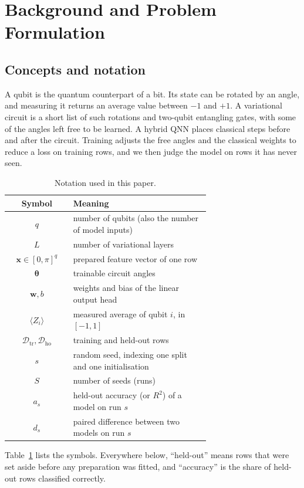 \documentclass[conference]{IEEEtran}
\begin{document}
\section{Background and Problem Formulation}
\subsection{Concepts and notation}
A qubit is the quantum counterpart of a bit. Its state can be rotated by an angle, and measuring it returns an average value between $-1$ and $+1$. A variational circuit is a short list of such rotations and two-qubit entangling gates, with some of the angles left free to be learned. A hybrid QNN places classical steps before and after the circuit. Training adjusts the free angles and the classical weights to reduce a loss on training rows, and we then judge the model on rows it has never seen.

\begin{table}[!t]
\caption{Notation used in this paper.}
\label{tab:notation}
\centering\footnotesize
\begin{tabular}{cp{0.68\linewidth}}
\toprule
Symbol & Meaning\\
\midrule
$q$ & number of qubits (also the number of model inputs)\\
$L$ & number of variational layers\\
$\mathbf{x}\in[0,\pi]^q$ & prepared feature vector of one row\\
$\boldsymbol{\theta}$ & trainable circuit angles\\
$\mathbf{w},b$ & weights and bias of the linear output head\\
$\langle Z_i\rangle$ & measured average of qubit $i$, in $[-1,1]$\\
$\mathcal{D}_\mathrm{tr},\mathcal{D}_\mathrm{ho}$ & training and held-out rows\\
$s$ & random seed, indexing one split and one initialisation\\
$S$ & number of seeds (runs)\\
$a_s$ & held-out accuracy (or $R^2$) of a model on run $s$\\
$d_s$ & paired difference between two models on run $s$\\
\bottomrule
\end{tabular}
\end{table}

Table~\ref{tab:notation} lists the symbols. Everywhere below, ``held-out'' means rows that were set aside before any preparation was fitted, and ``accuracy'' is the share of held-out rows classified correctly.
\end{document}
